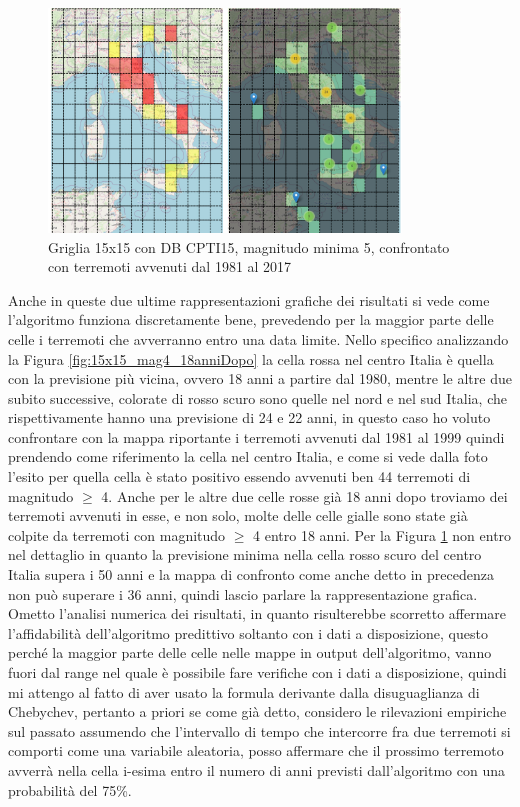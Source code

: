 \begin{figure}[H]
   \centering
   \includegraphics[width=0.835\textwidth]{images/15x15_mag5_confronto_36anniDopo_CPTI15.jpg}
   \caption{Griglia 15x15 con DB CPTI15, magnitudo minima 5, confrontato con terremoti avvenuti dal 1981 al 2017}
   \label{fig:15x15_mag5_36anniDopo}
\end{figure}

Anche in queste due ultime rappresentazioni grafiche dei risultati si vede come l'algoritmo funziona discretamente bene, prevedendo per la maggior parte delle celle i terremoti che avverranno entro una data limite. Nello specifico analizzando la Figura \ref{fig:15x15_mag4_18anniDopo} la cella rossa nel centro Italia \`e quella con la previsione pi\`u vicina, ovvero 18 anni a partire dal 1980, mentre le altre due subito successive, colorate di rosso scuro sono quelle nel nord e nel sud Italia, che rispettivamente hanno una previsione di 24 e 22 anni, in questo caso ho voluto confrontare con la mappa riportante i terremoti avvenuti dal 1981 al 1999 quindi prendendo come riferimento la cella nel centro Italia, e come si vede dalla foto l'esito per quella cella \`e stato positivo essendo avvenuti ben 44 terremoti di magnitudo $\ge$ 4. Anche per le altre due celle rosse gi\`a 18 anni dopo troviamo dei terremoti avvenuti in esse, e non solo, molte delle celle gialle sono state gi\`a colpite da terremoti con magnitudo $\ge$ 4 entro 18 anni. Per la Figura \ref{fig:15x15_mag5_36anniDopo} non entro nel dettaglio in quanto la previsione minima nella cella rosso scuro del centro Italia supera i 50 anni e la mappa di confronto come anche detto in precedenza non pu\`o superare i 36 anni, quindi lascio parlare la rappresentazione grafica.\\
Ometto l'analisi numerica dei risultati, in quanto risulterebbe scorretto affermare l'affidabilit\`a dell'algoritmo predittivo soltanto con i dati a disposizione, questo perch\'e la maggior parte delle celle nelle mappe in output dell'algoritmo, vanno fuori dal range nel quale \`e possibile fare verifiche con i dati a disposizione, quindi mi attengo al fatto di aver usato la formula derivante dalla disuguaglianza di Chebychev, pertanto a priori se come gi\`a detto, considero le rilevazioni empiriche sul passato assumendo che l'intervallo di tempo che intercorre fra due terremoti si comporti come una variabile aleatoria, posso affermare che il prossimo terremoto avverr\`a nella cella i-esima entro il numero di anni previsti dall'algoritmo con una probabilit\`a del 75\%.

